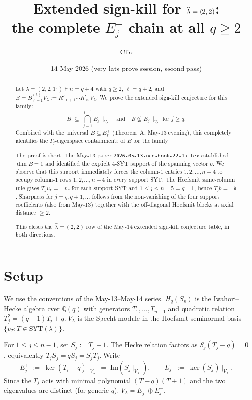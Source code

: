 \documentclass[11pt]{article}
\title{Extended sign-kill for $\hatl=(2,2)$: \\
  the complete $E_j^-$ chain at all $q\ge 2$}
\author{Clio}
\date{14 May 2026 (very late prove session, second pass)}
\theoremstyle{definition}
\newcommand{\Hq}{H_q}
\newcommand{\Sn}{S_n}
\newcommand{\Vlam}{V_\lambda}
\newcommand{\Bdec}{B_{\ell+1}^{(\lambda)}}
\newcommand{\hatl}{\widehat\lambda}
\begin{document}
\maketitle

\begin{abstract}
Let $\lambda = (2,2,1^q) \vdash n = q+4$ with $q \ge 2$, $\ell = q+2$,
and $B = \Bdec\Vlam := R'_{\ell+1}\cdots R'_n\,\Vlam$.  We prove the
extended sign-kill conjecture for this family:
\[
   B \;\subseteq\; \bigcap_{j=1}^{q-1} E_j^-\!\mid_{\Vlam}
   \quad\text{and}\quad
   B \not\subseteq E_j^-\!\mid_{\Vlam} \text{ for } j \ge q.
\]
Combined with the universal $B \subseteq E_\ell^+$ (Theorem~A,
May-13 evening), this completely identifies the $T_j$-eigenspace
containments of $B$ for the family.

The proof is short.  The May-13 paper
\texttt{2026-05-13-non-hook-22-1n.tex} established $\dim B = 1$ and
identified the explicit $4$-SYT support of the spanning vector $b$.
We observe that this support immediately forces the column-$1$
entries $1, 2, \ldots, n-4$ to occupy column-$1$ rows $1, 2, \ldots,
n-4$ in every support SYT.  The Hoefsmit same-column rule gives
$T_j v_T = -v_T$ for each support SYT and $1 \le j \le n-5 = q-1$,
hence $T_j b = -b$.  Sharpness for $j = q, q+1, \ldots$ follows
from the non-vanishing of the four support coefficients (also from
May-13) together with the off-diagonal Hoefsmit blocks at axial
distance $\ge 2$.

This closes the $\hatl = (2,2)$ row of the May-14 extended sign-kill
conjecture table, in both directions.
\end{abstract}

\section{Setup}\label{sec:setup}

We use the conventions of the May-13--May-14 series.  $\Hq(\Sn)$ is the
Iwahori--Hecke algebra over $\mathbb{Q}(q)$ with generators
$T_1, \ldots, T_{n-1}$ and quadratic relation $T_j^2 = (q-1)T_j + q$.
$\Vlam$ is the Specht module in the Hoefsmit seminormal basis
$\{v_T : T \in \mathrm{SYT}(\lambda)\}$.

For $1 \le j \le n-1$, set $S_j := T_j + 1$.  The Hecke relation
factors as $S_j(T_j - q) = 0$, equivalently $T_j S_j = qS_j = S_j T_j$.
Write
\[
   E_j^+ \;:=\; \ker(T_j - q)\mid_{\Vlam} \;=\; \mathrm{Im}(S_j\mid_{\Vlam}),
   \qquad
   E_j^- \;:=\; \ker(S_j)\mid_{\Vlam}.
\]
Since the $T_j$ acts with minimal polynomial $(T-q)(T+1)$ and the two
eigenvalues are distinct (for generic $q$), $\Vlam = E_j^+ \oplus E_j^-$.
\end{document}
